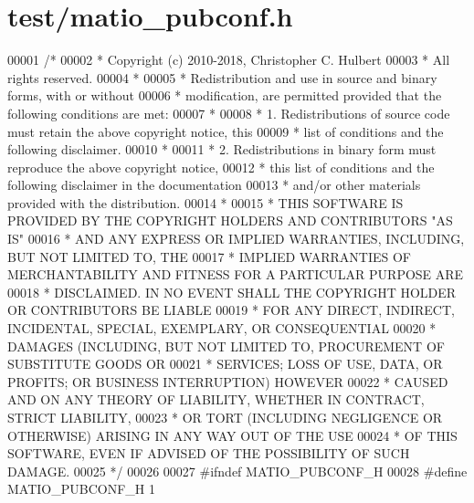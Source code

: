 \hypertarget{test_2matio__pubconf_8h_source}{}\section{test/matio\+\_\+pubconf.h}
\label{test_2matio__pubconf_8h_source}

\begin{DoxyCode}
00001 \textcolor{comment}{/*}
00002 \textcolor{comment}{ * Copyright (c) 2010-2018, Christopher C. Hulbert}
00003 \textcolor{comment}{ * All rights reserved.}
00004 \textcolor{comment}{ *}
00005 \textcolor{comment}{ * Redistribution and use in source and binary forms, with or without}
00006 \textcolor{comment}{ * modification, are permitted provided that the following conditions are met:}
00007 \textcolor{comment}{ *}
00008 \textcolor{comment}{ * 1. Redistributions of source code must retain the above copyright notice, this}
00009 \textcolor{comment}{ *    list of conditions and the following disclaimer.}
00010 \textcolor{comment}{ *}
00011 \textcolor{comment}{ * 2. Redistributions in binary form must reproduce the above copyright notice,}
00012 \textcolor{comment}{ *    this list of conditions and the following disclaimer in the documentation}
00013 \textcolor{comment}{ *    and/or other materials provided with the distribution.}
00014 \textcolor{comment}{ *}
00015 \textcolor{comment}{ * THIS SOFTWARE IS PROVIDED BY THE COPYRIGHT HOLDERS AND CONTRIBUTORS "AS IS"}
00016 \textcolor{comment}{ * AND ANY EXPRESS OR IMPLIED WARRANTIES, INCLUDING, BUT NOT LIMITED TO, THE}
00017 \textcolor{comment}{ * IMPLIED WARRANTIES OF MERCHANTABILITY AND FITNESS FOR A PARTICULAR PURPOSE ARE}
00018 \textcolor{comment}{ * DISCLAIMED. IN NO EVENT SHALL THE COPYRIGHT HOLDER OR CONTRIBUTORS BE LIABLE}
00019 \textcolor{comment}{ * FOR ANY DIRECT, INDIRECT, INCIDENTAL, SPECIAL, EXEMPLARY, OR CONSEQUENTIAL}
00020 \textcolor{comment}{ * DAMAGES (INCLUDING, BUT NOT LIMITED TO, PROCUREMENT OF SUBSTITUTE GOODS OR}
00021 \textcolor{comment}{ * SERVICES; LOSS OF USE, DATA, OR PROFITS; OR BUSINESS INTERRUPTION) HOWEVER}
00022 \textcolor{comment}{ * CAUSED AND ON ANY THEORY OF LIABILITY, WHETHER IN CONTRACT, STRICT LIABILITY,}
00023 \textcolor{comment}{ * OR TORT (INCLUDING NEGLIGENCE OR OTHERWISE) ARISING IN ANY WAY OUT OF THE USE}
00024 \textcolor{comment}{ * OF THIS SOFTWARE, EVEN IF ADVISED OF THE POSSIBILITY OF SUCH DAMAGE.}
00025 \textcolor{comment}{ */}
00026 
00027 \textcolor{preprocessor}{#ifndef MATIO\_PUBCONF\_H}
00028 \textcolor{preprocessor}{#define MATIO\_PUBCONF\_H 1}

\end{DoxyCode}
